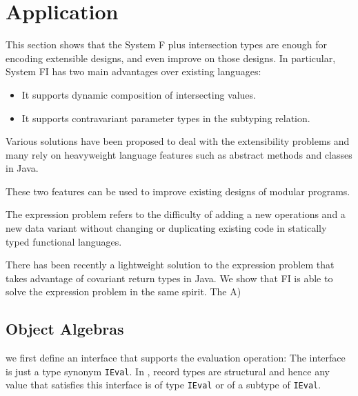 \section{Application}



This section shows that the System F plus intersection types are enough
for encoding extensible designs, and even improve on those designs. In
particular, System FI has two main advantages over existing languages:

\begin{itemize}
\item It supports dynamic composition of intersecting values.
\item It supports contravariant parameter types in the subtyping relation.
\end{itemize}

Various solutions have been proposed to deal with the extensibility problems and
many rely on heavyweight language features such as abstract methods and classes
in Java.

These two features can be used to improve existing designs of modular programs.


The expression problem refers to the difficulty of adding a new operations and a
new data variant without changing or duplicating existing code in statically
typed functional languages.

There has been recently a lightweight solution to the expression problem that
takes advantage of covariant return types in Java. We show that FI is able to
solve the expression problem in the same spirit. The
A)

\subsection{Object Algebras}


we first define an interface that supports the evaluation operation:
The interface is just a type synonym \lstinline{IEval}. In \systemFI, record
types are structural and hence any value that satisfies this interface is of
type \lstinline{IEval} or of a subtype of \lstinline{IEval}.

